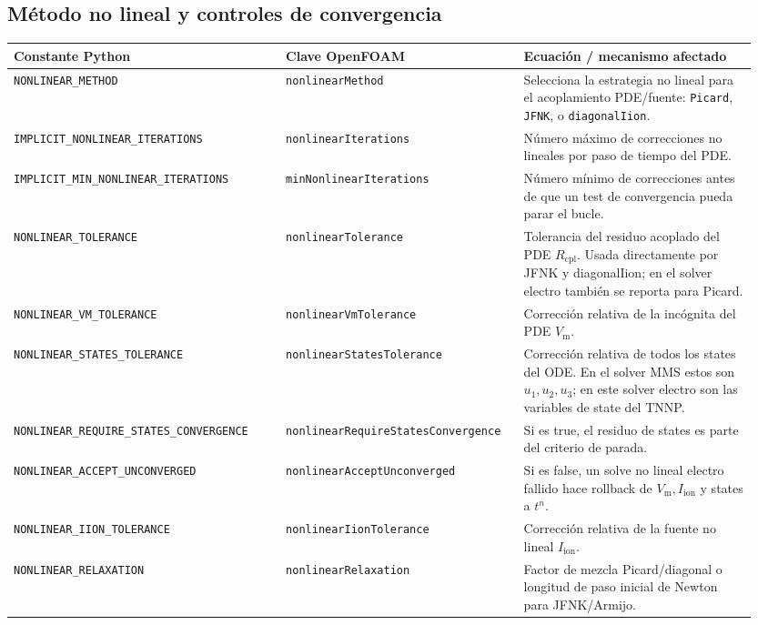 \documentclass[11pt,a4paper]{article}
\newcommand{\code}[1]{\texttt{\small #1}}
\newcommand{\Vm}{V_{\text{m}}}
\newcommand{\Iion}{I_{\mathrm{ion}}}
\begin{document}
\subsection{Método no lineal y controles de convergencia}
\begin{longtable}{@{}p{0.35\linewidth}p{0.30\linewidth}p{0.30\linewidth}@{}}
\toprule
Constante Python & Clave OpenFOAM & Ecuación / mecanismo afectado \\
\midrule \endhead
\code{NONLINEAR\_METHOD} & \code{nonlinearMethod} &
   Selecciona la estrategia no lineal para el acoplamiento PDE/fuente:
   \code{Picard}, \code{JFNK}, o \code{diagonalIion}. \\
\code{IMPLICIT\_NONLINEAR\_ITERATIONS} & \code{nonlinearIterations} &
   Número máximo de correcciones no lineales por paso de tiempo del PDE. \\
\code{IMPLICIT\_MIN\_NONLINEAR\_ITERATIONS} &
   \code{minNonlinearIterations} &
   Número mínimo de correcciones antes de que un test de convergencia pueda parar el
   bucle. \\
\code{NONLINEAR\_TOLERANCE} & \code{nonlinearTolerance} &
   Tolerancia del residuo acoplado del PDE $R_{\mathrm{cpl}}$. Usada directamente por
   JFNK y diagonalIion; en el solver electro también se reporta para Picard. \\
\code{NONLINEAR\_VM\_TOLERANCE} & \code{nonlinearVmTolerance} &
   Corrección relativa de la incógnita del PDE $\Vm$. \\
\code{NONLINEAR\_STATES\_TOLERANCE} &
   \code{nonlinearStatesTolerance} &
   Corrección relativa de todos los states del ODE. En el solver MMS estos son
   $u_1,u_2,u_3$; en este solver electro son las variables de state del TNNP. \\
\code{NONLINEAR\_REQUIRE\_STATES\_CONVERGENCE} &
   \code{nonlinearRequireStatesConvergence} &
   Si es true, el residuo de states es parte del criterio de parada. \\
\code{NONLINEAR\_ACCEPT\_UNCONVERGED} &
   \code{nonlinearAcceptUnconverged} &
   Si es false, un solve no lineal electro fallido hace rollback de $\Vm,\Iion$ y
   states a $t^n$. \\
\code{NONLINEAR\_IION\_TOLERANCE} & \code{nonlinearIionTolerance} &
   Corrección relativa de la fuente no lineal $\Iion$. \\
\code{NONLINEAR\_RELAXATION} & \code{nonlinearRelaxation} &
   Factor de mezcla Picard/diagonal o longitud de paso inicial de Newton para
   JFNK/Armijo. \\
\bottomrule
\end{longtable}
\end{document}
